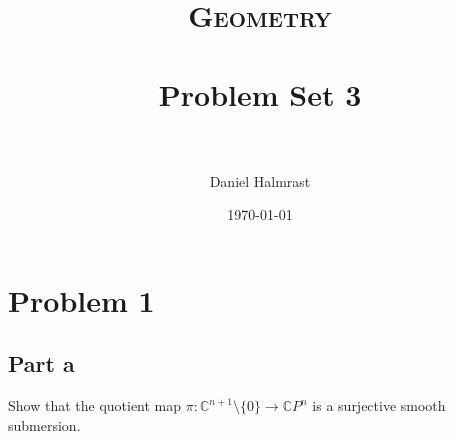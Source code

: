 \documentclass[fontsize=11pt]{scrartcl} %
\title{	
\normalfont \normalsize 
\textsc{Geometry} \\ [25pt] %
\horrule{0.5pt} \\[0.4cm] %
\huge Problem Set 3\\ %
\horrule{2pt} \\[0.5cm] %
}
\author{Daniel Halmrast} %
\date{\normalsize\today} %
\numberwithin{equation}{section} %
\numberwithin{figure}{section} %
\numberwithin{table}{section} %
\newcommand{\C}{\mathbb{C}}
\begin{document}
\maketitle %

\section*{Problem 1} %
\subsection*{Part a}
Show that the quotient map $\pi: \C^{n+1}\setminus \{0\}\to\C P^n$ is a surjective
smooth submersion.
\\
\end{document}
